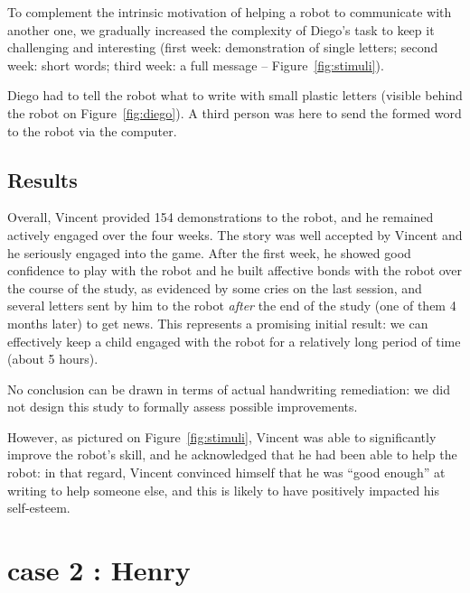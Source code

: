 \documentclass{sig-alternate}
\begin{document}
To complement the intrinsic motivation of helping a robot to communicate with another one, we
gradually increased the complexity of Diego's task to keep it challenging and
interesting (first week: demonstration of single letters; second week:
short words; third week: a full message -- Figure~\ref{fig:stimuli}).

Diego had to tell the robot what to write with small plastic letters (visible
behind the robot on Figure~\ref{fig:diego}). A third person was here to send
the formed word to the robot via the computer.



\subsection{Results}
Overall, Vincent provided 154 demonstrations to the robot, and he remained
actively engaged over the four weeks. The story was well accepted by Vincent and
he seriously engaged into the game. After the first week, he showed good
confidence to play with the robot and he built affective bonds with the robot
over the course of the study, as evidenced by some cries on the last session,
and several letters sent by him to the robot \emph{after} the end of the study
(one of them 4 months later) to get news. This represents a promising initial
result: we can effectively keep a child engaged with the robot for a relatively
long period of time (about 5 hours).

No conclusion can be drawn in terms of actual handwriting remediation: we did
not design this study to formally assess possible improvements.

However, as pictured on Figure~\ref{fig:stimuli}, Vincent was able to
significantly improve the robot's skill, and he acknowledged that he had been
able to help the robot: in that regard, Vincent convinced himself that he was
``good enough'' at writing to help someone else, and this is likely to have
positively impacted his self-esteem.



\section{case 2 : Henry}
\end{document}
